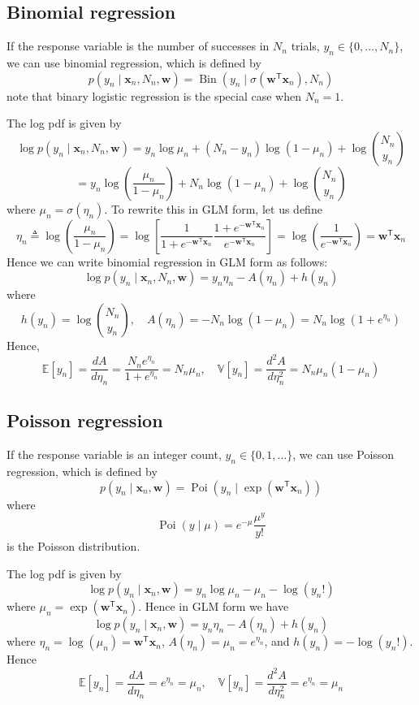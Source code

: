 \documentclass[11pt]{article}
\begin{document}
\subsection{Binomial regression}

If the response variable is the number of successes in $N_n$ trials, $y_n \in \{0,\ldots,N_n\}$, we can use binomial regression, which is defined by
\[
p(y_n \mid \mathbf{x}_n, N_n, \mathbf{w})
= \operatorname{Bin}(y_n \mid \sigma(\mathbf{w}^{\mathsf{T}}\mathbf{x}_n), N_n)
\]
note that binary logistic regression is the special case when $N_n = 1$. 

The log pdf is given by
\[
\log p(y_n \mid \mathbf{x}_n, N_n, \mathbf{w})
= y_n\log \mu_n + (N_n-y_n)\log(1-\mu_n) + \log \binom{N_n}{y_n}
\]
\[
= y_n\log\left(\frac{\mu_n}{1-\mu_n}\right)
+ N_n\log(1-\mu_n) + \log \binom{N_n}{y_n}
\]
where $\mu_n = \sigma(\eta_n)$. To rewrite this in GLM form, let us define
\[
\eta_n \triangleq \log\left(\frac{\mu_n}{1-\mu_n}\right)
= \log\left[\frac{1}{1+e^{-\mathbf{w}^{\mathsf{T}}\mathbf{x}_n}}\frac{1+e^{-\mathbf{w}^{\mathsf{T}}\mathbf{x}_n}}{e^{-\mathbf{w}^{\mathsf{T}}\mathbf{x}_n}}\right]
= \log\left(\frac{1}{e^{-\mathbf{w}^{\mathsf{T}}\mathbf{x}_n}}\right)
= \mathbf{w}^{\mathsf{T}}\mathbf{x}_n
\]
Hence we can write binomial regression in GLM form as follows:
\[
\log p(y_n \mid \mathbf{x}_n, N_n, \mathbf{w})
= y_n\eta_n - A(\eta_n) + h(y_n)
\]
where
\[
h(y_n) = \log \binom{N_n}{y_n}, \quad
A(\eta_n) = -N_n\log(1-\mu_n) = N_n\log(1+e^{\eta_n})
\]
Hence,
\[
\mathbb{E}[y_n] = \frac{dA}{d\eta_n} = \frac{N_n e^{\eta_n}}{1+e^{\eta_n}} = N_n \mu_n, \quad \mathbb{V}[y_n] = \frac{d^2A}{d\eta_n^2} = N_n \mu_n (1-\mu_n)
\]

\subsection{Poisson regression}

If the response variable is an integer count, $y_n \in \{0,1,\ldots\}$, we can use Poisson regression, which is defined by
\[
p(y_n \mid \mathbf{x}_n, \mathbf{w})
= \operatorname{Poi}(y_n \mid \exp(\mathbf{w}^{\mathsf{T}}\mathbf{x}_n))
\]
where
\[
\operatorname{Poi}(y \mid \mu) = e^{-\mu}\frac{\mu^y}{y!}
\]
is the Poisson distribution.

The log pdf is given by
\[
\log p(y_n \mid \mathbf{x}_n, \mathbf{w})
= y_n\log \mu_n - \mu_n - \log(y_n!)
\]
where $\mu_n = \exp(\mathbf{w}^{\mathsf{T}}\mathbf{x}_n)$. Hence in GLM form we have
\[
\log p(y_n \mid \mathbf{x}_n, \mathbf{w})
= y_n\eta_n - A(\eta_n) + h(y_n)
\]
where $\eta_n = \log(\mu_n) = \mathbf{w}^{\mathsf{T}}\mathbf{x}_n$, $A(\eta_n) = \mu_n = e^{\eta_n}$, and $h(y_n) = -\log(y_n!)$. Hence
\[
\mathbb{E}[y_n] = \frac{dA}{d\eta_n} = e^{\eta_n} = \mu_n, \quad
\mathbb{V}[y_n] = \frac{d^2A}{d\eta_n^2} = e^{\eta_n} = \mu_n
\]
\end{document}
